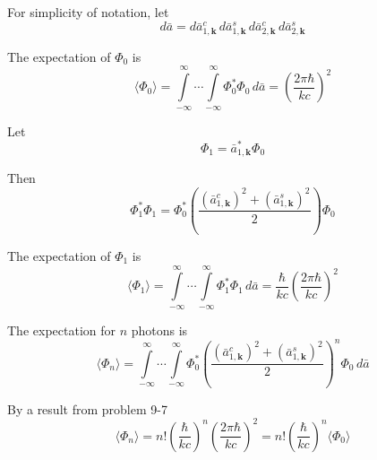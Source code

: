 \documentclass[12pt]{article}
\begin{document}
For simplicity of notation, let
\begin{equation*}
d\bar a=
d\bar a_{1,\mathbf k}^c\,d\bar a_{1,\mathbf k}^s
\,d\bar a_{2,\mathbf k}^c\,d\bar a_{2,\mathbf k}^s
\end{equation*}

The expectation of $\Phi_0$ is
\begin{equation*}
\langle\Phi_0\rangle=
\int\limits_{-\infty}^\infty\cdots
\int\limits_{-\infty}^\infty
\Phi_0^*\Phi_0
\,d\bar a
=\left(\frac{2\pi\hbar}{kc}\right)^2
\tag{1}
\end{equation*}

Let
\begin{equation*}
\Phi_1=\bar a_{1,\mathbf k}^*\Phi_0
\end{equation*}

Then
\begin{equation*}
\Phi_1^*\Phi_1=\Phi_0^*\left(\frac{(\bar a_{1,\mathbf k}^c)^2+(\bar a_{1,\mathbf k}^s)^2}{2}\right)\Phi_0
\end{equation*}

The expectation of $\Phi_1$ is
\begin{equation*}
\langle\Phi_1\rangle=
\int\limits_{-\infty}^\infty\cdots
\int\limits_{-\infty}^\infty
\Phi_1^*\Phi_1
\,d\bar a
=\frac{\hbar}{kc}
\left(\frac{2\pi\hbar}{kc}\right)^2
\tag{2}
\end{equation*}

The expectation for $n$ photons is
\begin{equation*}
\langle\Phi_n\rangle=
\int\limits_{-\infty}^\infty\cdots
\int\limits_{-\infty}^\infty
\Phi_0^*\left(\frac{(\bar a_{1,\mathbf k}^c)^2+(\bar a_{1,\mathbf k}^s)^2}{2}\right)^n\Phi_0
\,d\bar a
\end{equation*}

By a result from problem 9-7
\begin{equation*}
\langle\Phi_n\rangle
=n!\left(\frac{\hbar}{kc}\right)^n\left(\frac{2\pi\hbar}{kc}\right)^2
=n!\left(\frac{\hbar}{kc}\right)^n\langle\Phi_0\rangle
\tag{3}
\end{equation*}
\end{document}
